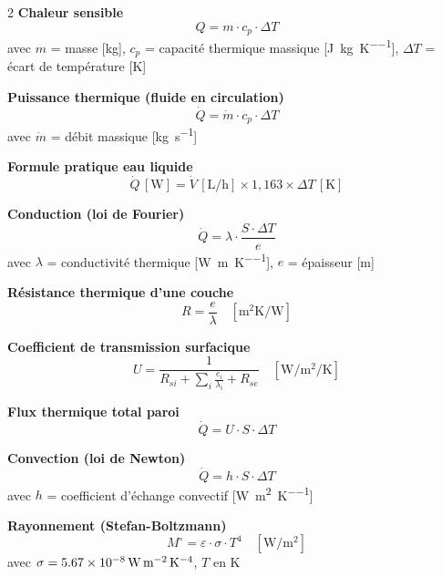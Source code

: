 \begin{tcolorbox}[
  enhanced, colback=FedBlue!3, colframe=FedBlue!50,
  fonttitle=\bfseries\sffamily, coltitle=FedBlue,
  title={FICHE MÉMO — Bases de la thermique}, boxrule=0.8pt, arc=2pt,
  width=\textwidth
]
\begin{multicols}{2}
\textbf{Chaleur sensible}
\[ Q = m \cdot c_p \cdot \Delta T \]
avec $m$ = masse [\si{\kilogram}], $c_p$ = capacité thermique massique [\si{\joule\per\kilogram\per\kelvin}], $\Delta T$ = écart de température [\si{\kelvin}]

\medskip
\textbf{Puissance thermique (fluide en circulation)}
\[ \dot{Q} = \dot{m} \cdot c_p \cdot \Delta T \]
avec $\dot{m}$ = débit massique [\si{\kilogram\per\second}]

\medskip
\textbf{Formule pratique eau liquide}
\[ \dot{Q}\,[\si{\watt}] = \dot{V}\,[\si{\liter\per\hour}] \times 1{,}163 \times \Delta T\,[\si{\kelvin}] \]

\medskip
\textbf{Conduction (loi de Fourier)}
\[ \dot{Q} = \lambda \cdot \frac{S \cdot \Delta T}{e} \]
avec $\lambda$ = conductivité thermique [\si{\watt\per\metre\per\kelvin}], $e$ = épaisseur [\si{\metre}]

\columnbreak

\textbf{Résistance thermique d'une couche}
\[ R = \frac{e}{\lambda} \quad \left[\si{\metre\squared\kelvin\per\watt}\right] \]

\medskip
\textbf{Coefficient de transmission surfacique}
\[ U = \frac{1}{\displaystyle R_{si} + \sum_i \frac{e_i}{\lambda_i} + R_{se}} \quad \left[\si{\watt\per\metre\squared\per\kelvin}\right] \]

\medskip
\textbf{Flux thermique total paroi}
\[ \dot{Q} = U \cdot S \cdot \Delta T \]

\medskip
\textbf{Convection (loi de Newton)}
\[ \dot{Q} = h \cdot S \cdot \Delta T \]
avec $h$ = coefficient d'échange convectif [\si{\watt\per\metre\squared\per\kelvin}]

\medskip
\textbf{Rayonnement (Stefan-Boltzmann)}
\[ M^{\circ} = \varepsilon \cdot \sigma \cdot T^4 \quad \left[\si{\watt\per\metre\squared}\right] \]
avec $\sigma = \SI{5{,}67e-8}{\watt\per\metre\squared\per\kelvin\tothe{4}}$, $T$ en \si{\kelvin}
\end{multicols}
\end{tcolorbox}

\finchapitre
